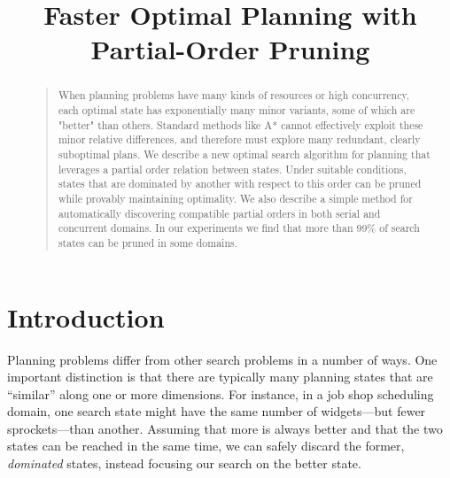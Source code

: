\documentclass[letterpaper]{article}
\theoremstyle{plain} \newtheorem{theorem}{Theorem} \newtheorem{proposition}{Proposition} \newtheorem{lemma}{Lemma}
\theoremstyle{definition} \newtheorem{definition}{Definition} \newtheorem{conjecture}{Conjecture} \newtheorem*{example}{Example}
\theoremstyle{remark} \newtheorem*{remark}{Remark} \newtheorem*{note}{Note} \newtheorem{case}{Case}
\begin{document}
%
\title{Faster Optimal Planning with Partial-Order Pruning}
\author{}

\maketitle
\begin{abstract}
\begin{quote}
  When planning problems have many kinds of resources or high
  concurrency, each optimal state has exponentially many minor
  variants, some of which are "better" than others. Standard methods
  like A* cannot effectively exploit these minor relative differences,
  and therefore must explore many redundant, clearly suboptimal
  plans. We describe a new optimal search algorithm for planning
  that leverages a partial order relation between states. Under
  suitable conditions, states that are dominated by another with
  respect to this order can be pruned while provably maintaining
  optimality. We also describe a simple method for automatically
  discovering compatible partial orders in both serial and concurrent
  domains. In our experiments we find that more than 99\% of search
  states can be pruned in some domains.
\end{quote}
\end{abstract}

\section{Introduction}

Planning problems differ from other search problems in a number of
ways. One important distinction is that there are typically many
planning states that are ``similar'' along one or more dimensions.
For instance, in a job shop scheduling domain, one search state
might have the same number of widgets---but fewer sprockets---than
another. Assuming that more is always better and that the two states
can be reached in the same time, we can safely discard the former,
\textit{dominated} states, instead focusing our search on the better
state.
\end{document}
